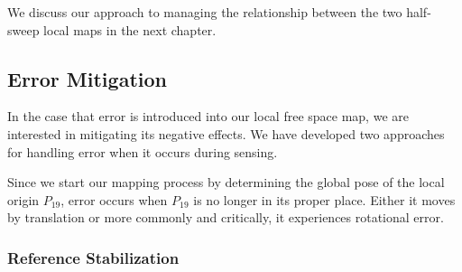 We discuss our approach to managing the relationship between the two half-sweep local maps in the next chapter.






\subsection{Error Mitigation}

In the case that error is introduced into our local free space map, we are interested in mitigating its negative effects.   We have developed two approaches for handling error when it occurs during sensing.

Since we start our mapping process by determining the global pose of the local origin $P_{19}$, error occurs when $P_{19}$ is no longer in its proper place.  Either it moves by translation or more commonly and critically, it experiences rotational error.  

\subsubsection{Reference Stabilization}
\label{sec:ref_stable}

